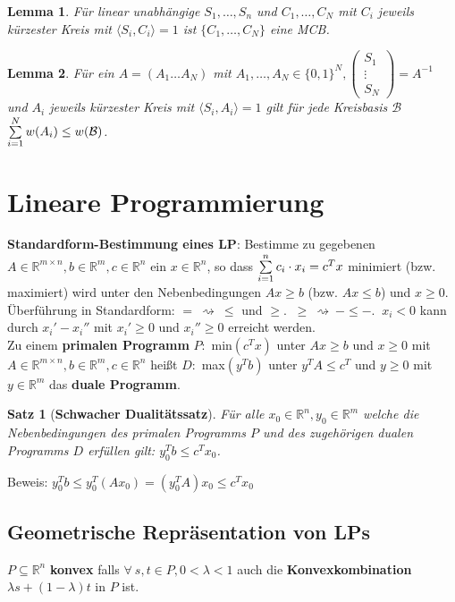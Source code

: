 \documentclass[a4paper,10pt]{scrartcl}
\newcommand{\tbf}{\textbf}
\newcommand{\Rn}{\mathbb{R}^n}
\newcommand{\Rm}{\mathbb{R}^m}
\newcommand{\Rmn}{\mathbb{R}^{m \times n}}
\newcommand{\calB}{\mathcal{B}}
\newtheorem{satz}{Satz}
\newtheorem{lemma}{Lemma}
\begin{document}
\begin{lemma}
 Für linear unabhängige $S_1, \ldots, S_n$ und $C_1, \ldots, C_N$ mit $C_i$ jeweils kürzester Kreis mit $\langle S_i, C_i \rangle = 1$ ist $\{C_1, \ldots, C_N\}$ eine MCB.
\end{lemma}


\begin{lemma}
 Für ein $A = (A_1 \ldots A_N)$ mit $A_1, \ldots, A_N \in \{0,1\}^N, \begin{pmatrix} S_1 \\ \vdots \\ S_N \end{pmatrix} = A^{-1}$ und $A_i$ jeweils kürzester Kreis mit $\langle S_i, A_i \rangle = 1$ gilt für jede Kreisbasis $\calB$ $\sum_{i=1}^{N} \limits w(A_i) \leq w(\calB)$.
\end{lemma}


\newpage
\section{Lineare Programmierung}
\tbf{Standardform-Bestimmung eines LP}: Bestimme zu gegebenen $A \in \Rmn, b \in \Rm, c \in \Rn$ ein $x \in \Rn$, so dass $\sum_{i=1}^{n} \limits c_i \cdot x_i = c^T x$ minimiert (bzw. maximiert) wird unter den Nebenbedingungen $Ax \geq b$ (bzw. $Ax \leq b$) und $x \geq 0$. \\

Überführung in Standardform: $= \ \rightsquigarrow \ \leq$ und $\geq$. $\ \geq \ \rightsquigarrow \ - \leq -$. $\ x_i < 0$ kann durch $x_i' - x_i''$ mit $x_i' \geq 0$ und $x_i'' \geq 0$ erreicht werden. \\

Zu einem \tbf{primalen Programm} $P:$ min$(c^T x)$ unter $Ax \geq b$ und $x \geq 0$ mit $A \in \Rmn, b \in \Rm, c \in \Rn$ heißt $D:$ max$(y^T b)$ unter $y^T A \leq c^T$ und $y \geq 0$ mit $y \in \Rm$ das \tbf{duale Programm}. \\

\begin{satz}[\tbf{Schwacher Dualitätssatz}]
 Für alle $x_0 \in \Rn, y_0 \in \Rm$ welche die Nebenbedingungen des primalen Programms $P$ und des zugehörigen dualen Programms $D$ erfüllen gilt: $y_0^T b \leq c^T x_0$.
\end{satz}

Beweis: $y_0^T b \leq y_0^T (A x_0) = (y_0^T A) x_0 \leq c^T x_0$ \\

\subsection{Geometrische Repräsentation von LPs}
$P \subseteq \Rn$ \tbf{konvex} falls $\forall \ s,t \in P, 0 < \lambda < 1$ auch die \tbf{Konvexkombination} $\lambda s + (1 - \lambda) t$ in $P$ ist. \\
\end{document}
